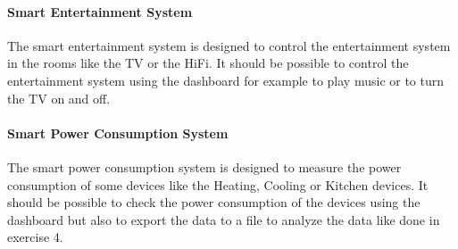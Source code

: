 \paragraph{Smart Entertainment System}
The smart entertainment system is designed to control the entertainment system in the rooms like the TV or the HiFi.
It should be possible to control the entertainment system using the dashboard for example to play music or to turn the 
TV on and off.

\paragraph{Smart Power Consumption System}
The smart power consumption system is designed to measure the power consumption of some devices like the Heating, 
Cooling or Kitchen devices. It should be possible to check the power consumption of the devices using the dashboard 
but also to export the data to a file to analyze the data like done in exercise 4.